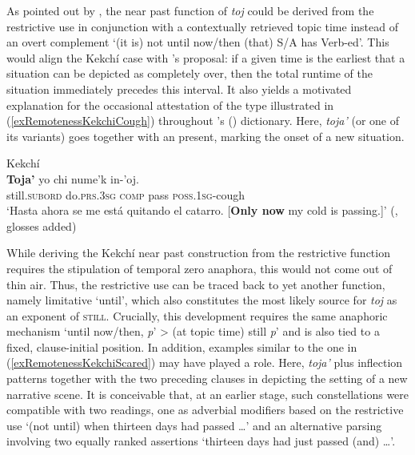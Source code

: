 As pointed out by \textcite{Kockelman2020}, the near past function of \textit{toj} could be derived from the restrictive use in conjunction with a contextually retrieved topic time instead of an overt complement \lq (it is) not until now/then (that) S/A has Verb-ed\rq{}. This would align the Kekchí case with \citeauthor{Aonuki2021}'s proposal: if a given time is the earliest that a situation can be depicted as completely over, then the total runtime of the situation immediately precedes this interval. It also yields a motivated explanation for the occasional attestation of the type illustrated in (\ref{exRemotenessKekchiCough}) throughout \citeauthor{SamJuarezEtAl2003}'s (\citeyear{SamJuarezEtAl2003}) dictionary. Here, \textit{toja\rq} (or one of its variants) goes together with an  present, marking the onset of a new situation.

\begin{exe}
	\ex Kekchí\label{exRemotenessKekchiCough}\\
	\gll \textbf{Toja\rq} yo chi nume\rq{}k in-\rq{}oj.\\
	still.\textsc{subord} do.\textsc{prs}.3\textsc{sg} \textsc{comp} pass \textsc{poss}.1\textsc{sg}-cough\\
	\glt \lq Hasta ahora se me está quitando el catarro. [\textbf{Only now} my cold is passing.]\rq{ }(\cite[231]{SamJuarezEtAl2003}, glosses added)
\end{exe}

While deriving the Kekchí near past construction from the restrictive function requires the stipulation of temporal zero anaphora, this would not come out of thin air. Thus, the restrictive use can be traced back to yet another function, namely limitative \lq until\rq{}, which also constitutes the most likely source for \textit{toj} as an exponent of \textsc{still}. Crucially, this development requires the same anaphoric mechanism \lq until now/then, \textit{p}\rq{} > (at topic time) still \textit{p}\rq{} and is also tied to a fixed, clause-initial position. In addition, examples similar to the one in (\ref{exRemotenessKekchiScared}) may have played a role. Here, \textit{toja\rq} plus  inflection patterns together with the two preceding clauses in depicting the setting of a new narrative scene. It is conceivable that, at an earlier stage, such constellations were compatible with two readings, one as adverbial modifiers based on the restrictive use  \lq (not until) when thirteen days had passed …\rq{} and an alternative parsing involving two equally ranked assertions \lq thirteen days had just passed (and) …\rq{}.

